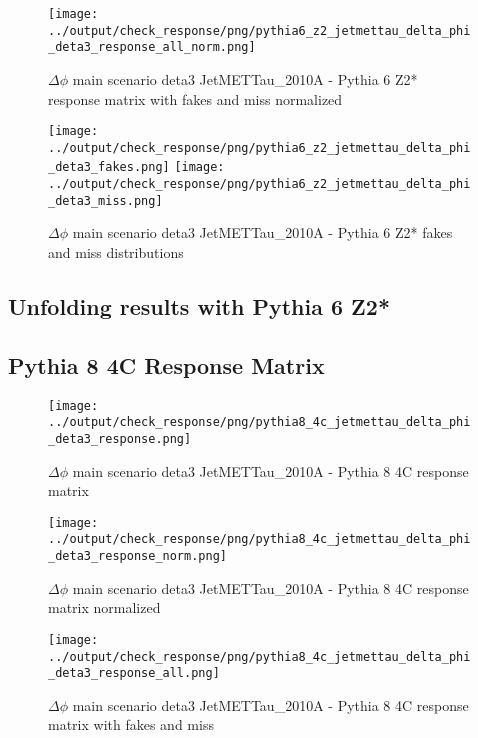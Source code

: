\documentclass[11pt]{book}
\begin{document}
\begin{figure}[ht]
\centering
\texttt{[image: ../output/check\_response/png/pythia6\_z2\_jetmettau\_delta\_phi\_deta3\_response\_all\_norm.png]}
\caption{$\Delta\phi$ main scenario deta3 JetMETTau\_2010A - Pythia 6 Z2* response matrix with fakes and miss normalized}
\label{p6_jetmettau_delta_phi_deta3_response_all_norm}
\end{figure}

\begin{figure}[ht]
\centering
\texttt{[image: ../output/check\_response/png/pythia6\_z2\_jetmettau\_delta\_phi\_deta3\_fakes.png]}
\texttt{[image: ../output/check\_response/png/pythia6\_z2\_jetmettau\_delta\_phi\_deta3\_miss.png]}
\caption{$\Delta\phi$ main scenario deta3 JetMETTau\_2010A - Pythia 6 Z2* fakes and miss distributions}
\label{p6_jetmettau_delta_phi_deta3_fakesmiss}
\end{figure}


\clearpage
\subsection{Unfolding results with Pythia 6 Z2*}


\clearpage
\subsection{Pythia 8 4C Response Matrix}


\begin{figure}[ht]
\centering
\texttt{[image: ../output/check\_response/png/pythia8\_4c\_jetmettau\_delta\_phi\_deta3\_response.png]}
\caption{$\Delta\phi$ main scenario deta3 JetMETTau\_2010A - Pythia 8 4C response matrix}
\label{p8_jetmettau_delta_phi_deta3_response}
\end{figure}

\begin{figure}[ht]
\centering
\texttt{[image: ../output/check\_response/png/pythia8\_4c\_jetmettau\_delta\_phi\_deta3\_response\_norm.png]}
\caption{$\Delta\phi$ main scenario deta3 JetMETTau\_2010A - Pythia 8 4C response matrix normalized}
\label{p8_jetmettau_delta_phi_deta3_response_norm}
\end{figure}

\begin{figure}[ht]
\centering
\texttt{[image: ../output/check\_response/png/pythia8\_4c\_jetmettau\_delta\_phi\_deta3\_response\_all.png]}
\caption{$\Delta\phi$ main scenario deta3 JetMETTau\_2010A - Pythia 8 4C response matrix with fakes and miss}
\label{p8_jetmettau_delta_phi_deta3_response_all}
\end{figure}
\end{document}
